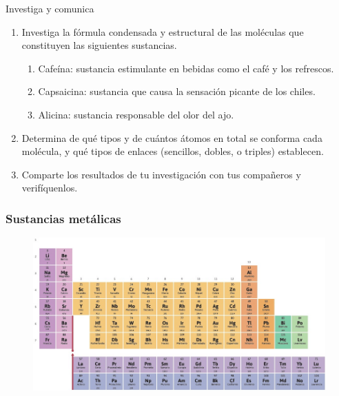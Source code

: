 \documentclass[11pt]{book}
\begin{document}
\begin{minipage}{\textwidth}
  \begin{boxK}
    Investiga y comunica
    \begin{enumerate}
      \item Investiga la fórmula condensada y estructural de las moléculas que constituyen las siguientes sustancias.
            \begin{enumerate}
              \item Cafeína: sustancia estimulante en bebidas como el café y los refrescos.
              \item Capsaicina: sustancia que causa la sensación picante de los chiles.
              \item Alicina: sustancia responsable del olor del ajo.
            \end{enumerate}
      \item Determina de qué tipos y de cuántos átomos en total se conforma cada molécula, y qué tipos de enlaces
            (sencillos, dobles, o triples) establecen.
      \item Comparte los resultados de tu investigación con tus compañeros y verifíquenlos.
    \end{enumerate}
  \end{boxK}
\end{minipage}

\subsubsection{Sustancias metálicas}

\begin{figure}[H]
  \centering
  \includegraphics[width=\textwidth]{metales.jpg}
  \label{fig:metales}
\end{figure}
\end{document}
